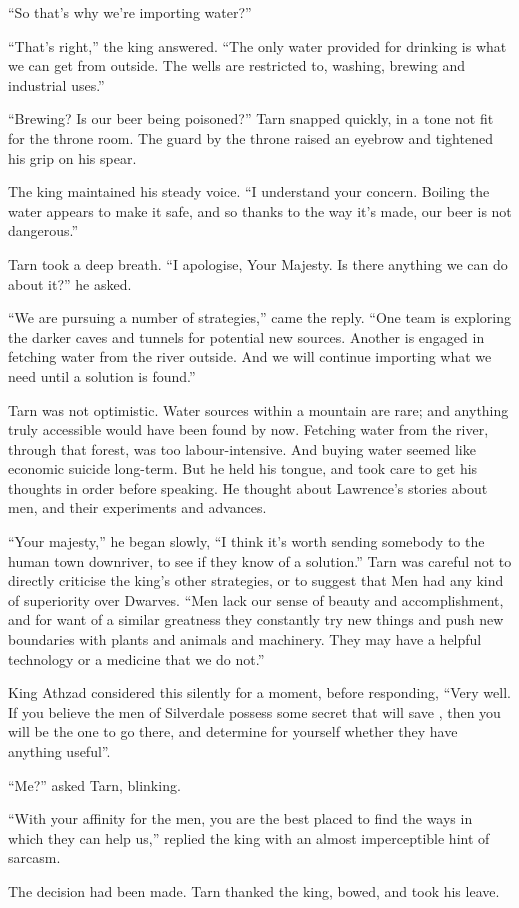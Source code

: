 ``So that's why we're importing water?''

``That's right,'' the king answered.  ``The only water provided for drinking is what we can get from outside.  The wells are restricted to, washing, brewing and industrial uses.''

``Brewing?  Is our beer being poisoned?'' Tarn snapped quickly, in a tone not fit for the throne room.  The guard by the throne raised an eyebrow and tightened his grip on his spear.

The king maintained his steady voice.  ``I understand your concern.  Boiling the water appears to make it safe, and so thanks to the way it's made, our beer is not dangerous.''

Tarn took a deep breath.  ``I apologise, Your Majesty.  Is there anything we can do about it?'' he asked.

``We are pursuing a number of strategies,'' came the reply.  ``One team is exploring the darker caves and tunnels for potential new sour\-ces.  Another is engaged in fetching water from the river outside.  And we will continue importing what we need until a solution is found.''

Tarn was not optimistic.  Water sources within a mountain are rare; and anything truly accessible would have been found by now.  Fetching water from the river, through that forest, was too labour-intensive.  And buying water seemed like economic suicide long-term.  But he held his tongue, and took care to get his thoughts in order before speaking.  He thought about Lawrence's stories about men, and their experiments and advances.

``Your majesty,'' he began slowly, ``I think it's worth sending somebody to the human town downriver, to see if they know of a solution.''  Tarn was careful not to directly criticise the king's other strategies, or to suggest that Men had any kind of superiority over Dwarves.
``Men lack our sense of beauty and accomplishment, and for want of a similar greatness they constantly try new things and push new boundaries with plants and animals and machinery.  They may have a helpful technology or a medicine that we do not.''

King Athzad considered this silently for a moment, before responding, ``Very well.  If you believe the men of Silverdale possess some secret that will save \korbarthrond, then you will be the one to go there, and determine for yourself whether they have anything useful''.

``Me?'' asked Tarn, blinking.

``With your affinity for the men, you are the best placed to find the ways in which they can help us,'' replied the king with an almost imperceptible hint of sarcasm.

The decision had been made.  Tarn thanked the king, bowed, and took his leave.